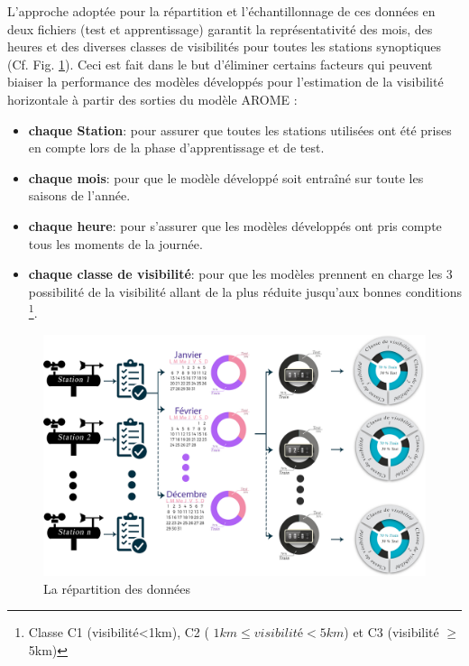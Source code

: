 L'approche adoptée pour la répartition et l’échantillonnage de ces données en deux fichiers (test et apprentissage) garantit la représentativité des mois, des heures et des diverses classes de visibilités pour toutes les stations synoptiques (Cf. Fig. \ref{rep_donnees}). Ceci est fait dans le but d'éliminer certains facteurs qui peuvent biaiser la performance des modèles développés pour l'estimation de la visibilité horizontale à partir des sorties du modèle AROME :\\


\begin{itemize}
    \item[\ding{109}] \textbf{chaque Station}: pour assurer que toutes les stations utilisées ont été prises en compte lors de la phase d'apprentissage et de test.
    \item[\ding{109}] \textbf{chaque mois}: pour que le modèle développé soit entraîné sur toute les saisons de l'année.
    \item[\ding{109}] \textbf{chaque heure}: pour s'assurer que les modèles développés ont pris compte tous les moments de la journée.
    \item[\ding{109}] \textbf{chaque classe de visibilité}: pour que les modèles prennent en charge les 3 possibilité de la visibilité allant de la plus réduite jusqu'aux bonnes conditions \footnote{Classe C1 (visibilité<1km), C2 ( $1 km \le visibilité  < 5km$) et C3 (visibilité $\ge$ 5km)}.
\end{itemize}



\newpage
\begin{landscape}
\begin{figure}[!h]
\includegraphics[width=23 cm, height= 14 cm]{img/data_prep.jpg}
\caption{La répartition des données}
\label{rep_donnees}
\end{figure}
\end{landscape}